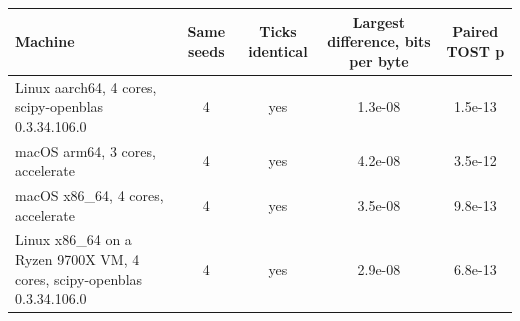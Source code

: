 \begin{tabular}{p{4.6cm}cccc}
\toprule
Machine & Same seeds & Ticks identical & Largest difference, bits per byte & Paired TOST p \\
\midrule
Linux aarch64, 4 cores, scipy-openblas 0.3.34.106.0 & 4 & yes & 1.3e-08 & 1.5e-13 \\
macOS arm64, 3 cores, accelerate & 4 & yes & 4.2e-08 & 3.5e-12 \\
macOS x86\_64, 4 cores, accelerate & 4 & yes & 3.5e-08 & 9.8e-13 \\
Linux x86\_64 on a Ryzen 9700X VM, 4 cores, scipy-openblas 0.3.34.106.0 & 4 & yes & 2.9e-08 & 6.8e-13 \\
\bottomrule
\end{tabular}
